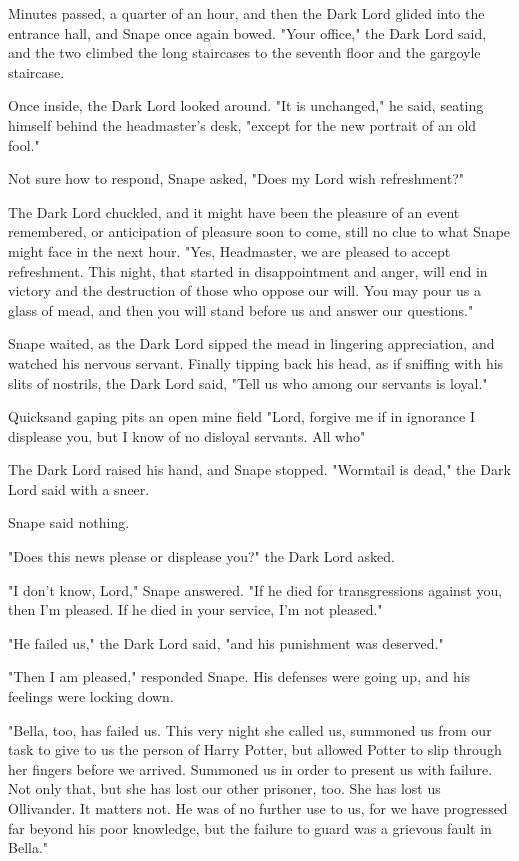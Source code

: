Minutes passed, a quarter of an hour, and then the Dark Lord glided into the entrance hall, and Snape once again bowed. "Your office," the Dark Lord said, and the two climbed the long staircases to the seventh floor and the gargoyle staircase.

Once inside, the Dark Lord looked around. "It is unchanged," he said, seating himself behind the headmaster's desk, "except for the new portrait of an old fool."

Not sure how to respond, Snape asked, "Does my Lord wish refreshment?"

The Dark Lord chuckled, and it might have been the pleasure of an event remembered, or anticipation of pleasure soon to come, still no clue to what Snape might face in the next hour. "Yes, Headmaster, we are pleased to accept refreshment. This night, that started in disappointment and anger, will end in victory and the destruction of those who oppose our will. You may pour us a glass of mead, and then you will stand before us and answer our questions."

Snape waited, as the Dark Lord sipped the mead in lingering appreciation, and watched his nervous servant. Finally tipping back his head, as if sniffing with his slits of nostrils, the Dark Lord said, "Tell us who among our servants is loyal."

Quicksand{\el} gaping pits{\el} an open mine field{\el} "Lord, forgive me if in ignorance I displease you, but I know of no disloyal servants. All who{\el}"

The Dark Lord raised his hand, and Snape stopped. "Wormtail is dead," the Dark Lord said with a sneer.

Snape said nothing.

"Does this news please or displease you?" the Dark Lord asked.

"I don't know, Lord," Snape answered. "If he died for transgressions against you, then I'm pleased. If he died in your service, I'm not pleased."

"He failed us," the Dark Lord said, "and his punishment was deserved."

"Then I am pleased," responded Snape. His defenses were going up, and his feelings were locking down.

"Bella, too, has failed us. This very night she called us, summoned us from our task to give to us the person of Harry Potter, but allowed Potter to slip through her fingers before we arrived. Summoned us in order to present us with failure. Not only that, but she has lost our other prisoner, too. She has lost us Ollivander. It matters not. He was of no further use to us, for we have progressed far beyond his poor knowledge, but the failure to guard was a grievous fault in Bella."

